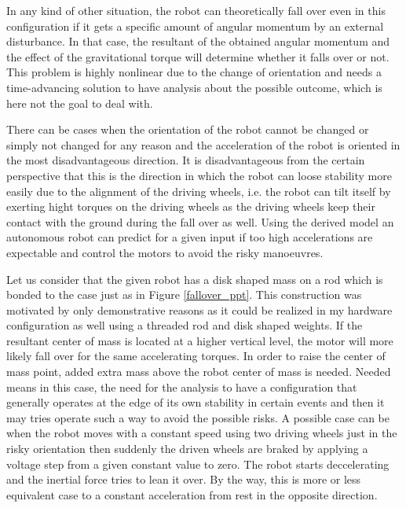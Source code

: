 \documentclass[12pt,english,twoside]{article}
\begin{document}
In any kind of other situation, the robot can theoretically fall over even in this configuration if it gets a specific amount of angular momentum by an external disturbance. In that case, the resultant of the obtained angular momentum and the effect of the gravitational torque will determine whether it falls over or not. This problem is highly nonlinear due to the change of orientation and needs a time-advancing solution to have analysis about the possible outcome, which is here not the goal to deal with.

There can be cases when the orientation of the robot cannot be changed or simply not changed for any reason and the acceleration of the robot is oriented in the most disadvantageous direction. It is disadvantageous from the certain perspective that this is the direction in which the robot can loose stability more easily due to the alignment of the driving wheels, i.e. the robot can tilt itself by exerting hight torques on the driving wheels as the driving wheels keep their contact with the ground during the fall over as well. Using the derived model an autonomous robot can predict for a given input if too high accelerations are expectable and control the motors to avoid the risky manoeuvres. 

Let us consider that the given robot has a disk shaped mass on a rod which is bonded to the case just as in Figure \ref{fallover_ppt}. This construction was motivated by only demonstrative reasons as it could be realized in my hardware configuration as well using a threaded rod and disk shaped weights. If the resultant center of mass is located at a higher vertical level, the motor will more likely fall over for the same accelerating torques. In order to raise the center of mass point, added extra mass above the robot center of mass is needed. Needed means in this case, the need for the analysis to have a configuration that generally operates at the edge of its own stability in certain events and then it may tries operate such a way to avoid the possible risks. A possible case can be when the robot moves with a constant speed using two driving wheels just in the risky orientation then suddenly the driven wheels are braked by applying a voltage step from a given constant value to zero. The robot starts deccelerating and the inertial force tries to lean it over. By the way, this is more or less equivalent case to a constant acceleration from rest in the opposite direction.
\end{document}
